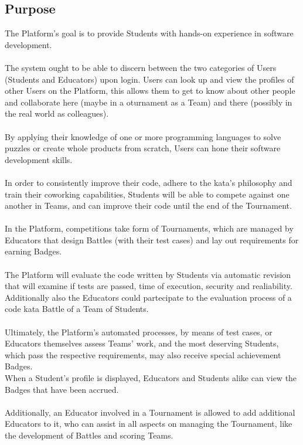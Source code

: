 \subsection{Purpose}
The Platform's goal is to provide Students with hands-on experience in software development.
\\
\\
The system ought to be able to discern between the two categories of Users (Students and Educators) upon login.
Users can look up and view the profiles of other Users on the Platform, this allows them to get to know about other people and collaborate here (maybe in a oturnament as a Team) and there (possibly in the real world as colleagues).
\\ \\
By applying their knowledge of one or more programming languages to solve puzzles or create whole products from scratch, Users can hone their software development skills. 
\\ \\
In order to consistently improve their code, adhere to the kata's philosophy and train their coworking capabilities, Students will be able to compete against one another in Teams, and can improve their code until the end of the Tournament.
\\ \\
In the Platform, competitions take form of Tournaments, which are managed by Educators that design Battles (with their test cases) and lay out requirements for earning Badges.
\\ \\
The Platform will evaluate the code written by Students via automatic revision that will examine if tests are passed, time of execution, security and realiability. Additionally also the Educators could partecipate to the evaluation process of a code kata Battle of a Team of Students.
\\ \\
Ultimately, the Platform's automated processes, by means of test cases, or Educators themselves assess Teams' work, and the most deserving Students, which pass the respective requirements, may also receive special achievement Badges.\\ When a Student's profile is displayed, Educators and Students alike can view the Badges that have been accrued.
\\ \\
Additionally, an Educator involved in a Tournament is allowed to add additional Educators to it, who can assist in all aspects on managing the Tournament, like the development of Battles and scoring Teams.

